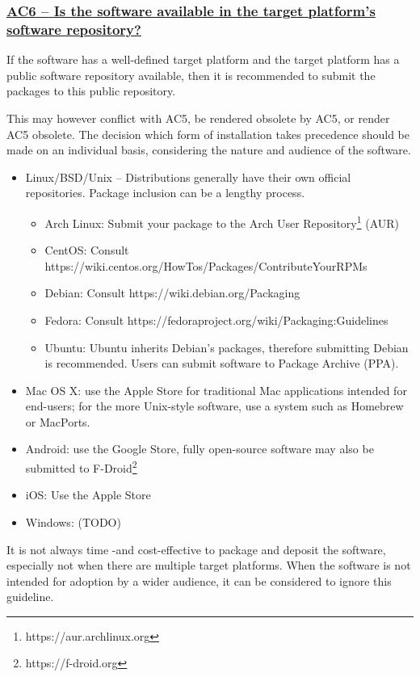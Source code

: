 \documentclass[a4paper,11pt]{article}
\newcommand{\indicator}[1]{\subsubsection*{\underline{#1}}}
\begin{document}
\newcommand{\acSixName}{AC6}
\newcommand{\acSixID}{\acSixName}
\newcommand{\acSixText}{Is the software available in the target platform's software repository?}
\indicator{\acSixName{ }--{ }\acSixText}\label{id:ac6} 

If the software has a well-defined target platform and the target platform has
a public software repository available, then it is recommended to submit the
packages to this public repository.

This may however conflict with AC5, be rendered obsolete by AC5, or render AC5
obsolete. The decision which form of installation takes precedence should be
made on an individual basis, considering the nature and audience of the
software.

\begin{itemize}
    \item Linux/BSD/Unix -- Distributions generally have their own official repositories. Package inclusion can be a lengthy process.
    \begin{itemize}
        \item Arch Linux: Submit your package to the Arch User Repository\footnote{https://aur.archlinux.org} (AUR)
		\item CentOS: Consult https://wiki.centos.org/HowTos/Packages/ContributeYourRPMs
        \item Debian: Consult https://wiki.debian.org/Packaging
        \item Fedora: Consult https://fedoraproject.org/wiki/Packaging:Guidelines
        \item Ubuntu: Ubuntu inherits Debian's packages, therefore submitting Debian is recommended. Users can submit software  to Package Archive (PPA).
    \end{itemize}
    \item Mac OS X: use the Apple Store for traditional Mac applications intended for end-users; for the more Unix-style
        software, use a system such as Homebrew or MacPorts.
    \item Android: use the Google Store, fully open-source software may also be submitted to F-Droid\footnote{https://f-droid.org}
    \item iOS: Use the Apple Store
    \item Windows: (TODO) 
\end{itemize}

It is not always time -and cost-effective to package and deposit the software,
especially not when there are multiple target platforms. When the software is
not intended for adoption by a wider audience, it can be considered to ignore
this guideline.
\end{document}
